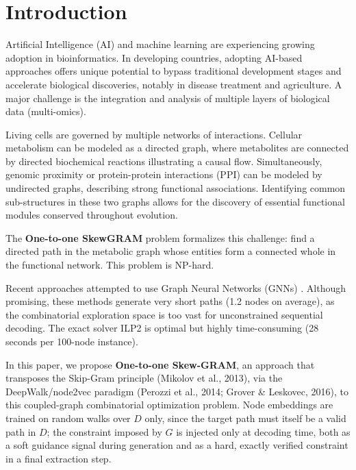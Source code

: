 \documentclass{llncs}
\begin{document}
\section{Introduction}

Artificial Intelligence (AI) and machine learning are experiencing growing adoption in bioinformatics. In developing countries, adopting AI-based approaches offers unique potential to bypass traditional development stages and accelerate biological discoveries, notably in disease treatment and agriculture. A major challenge is the integration and analysis of multiple layers of biological data (multi-omics).

Living cells are governed by multiple networks of interactions. Cellular metabolism can be modeled as a directed graph, where metabolites are connected by directed biochemical reactions illustrating a causal flow. Simultaneously, genomic proximity or protein-protein interactions (PPI) can be modeled by undirected graphs, describing strong functional associations. Identifying common sub-structures in these two graphs allows for the discovery of essential functional modules conserved throughout evolution.

The \textbf{One-to-one SkewGRAM} problem formalizes this challenge: find a directed path in the metabolic graph whose entities form a connected whole in the functional network. This problem is NP-hard.

Recent approaches attempted to use Graph Neural Networks (GNNs) \cite{sidi}. Although promising, these methods generate very short paths (1.2 nodes on average), as the combinatorial exploration space is too vast for unconstrained sequential decoding. The exact solver ILP2 \cite{sidi} is optimal but highly time-consuming (28 seconds per 100-node instance).

In this paper, we propose \textbf{One-to-one Skew-GRAM}, an approach that transposes the Skip-Gram principle (Mikolov et al., 2013), via the DeepWalk/node2vec paradigm (Perozzi et al., 2014; Grover \& Leskovec, 2016), to this coupled-graph combinatorial optimization problem. Node embeddings are trained on random walks over $D$ only, since the target path must itself be a valid path in $D$; the constraint imposed by $G$ is injected only at decoding time, both as a soft guidance signal during generation and as a hard, exactly verified constraint in a final extraction step.
\end{document}
